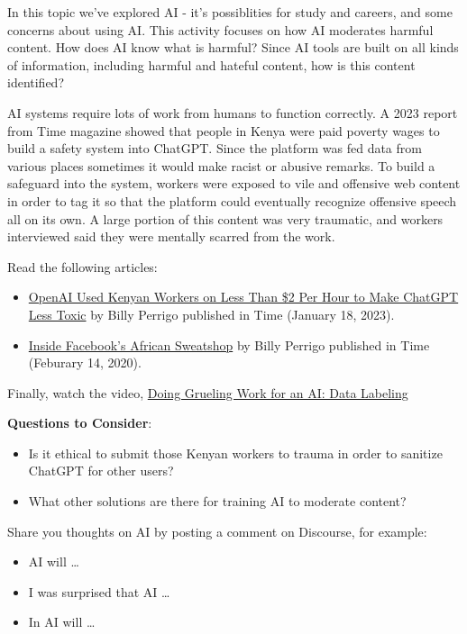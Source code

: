 \documentclass[
]{book}
\providecommand{\tightlist}{%
  \setlength{\itemsep}{0pt}\setlength{\parskip}{0pt}}
\theoremstyle{definition}
\theoremstyle{definition}
\theoremstyle{definition}
\theoremstyle{definition}
\theoremstyle{remark}
\begin{document}
\begin{reflect}
In this topic we've explored AI - it's possiblities for study and careers, and some concerns about using AI. This activity focuses on how AI moderates harmful content. How does AI know what is harmful? Since AI tools are built on all kinds of information, including harmful and hateful content, how is this content identified?

AI systems require lots of work from humans to function correctly. A 2023 report from Time magazine showed that people in Kenya were paid poverty wages to build a safety system into ChatGPT. Since the platform was fed data from various places sometimes it would make racist or abusive remarks. To build a safeguard into the system, workers were exposed to vile and offensive web content in order to tag it so that the platform could eventually recognize offensive speech all on its own. A large portion of this content was very traumatic, and workers interviewed said they were mentally scarred from the work.

Read the following articles:

\begin{itemize}
\tightlist
\item
  \href{https://time.com/6247678/openai-chatgpt-kenya-workers/}{OpenAI Used Kenyan Workers on Less Than \$2 Per Hour to Make ChatGPT Less Toxic} by Billy Perrigo published in Time (January 18, 2023).
\item
  \href{https://time.com/6147458/facebook-africa-content-moderation-employee-treatment/}{Inside Facebook's African Sweatshop} by Billy Perrigo published in Time (Feburary 14, 2020).
\end{itemize}

Finally, watch the video, \href{https://www.youtube.com/watch?v=ug_p2wHhla0}{Doing Grueling Work for an AI: Data Labeling}

\textbf{Questions to Consider}:

\begin{itemize}
\tightlist
\item
  Is it ethical to submit those Kenyan workers to trauma in order to sanitize ChatGPT for other users?
\item
  What other solutions are there for training AI to moderate content?
\end{itemize}

Share you thoughts on AI by posting a comment on Discourse, for example:

\begin{itemize}
\tightlist
\item
  AI will \ldots{}\\
\item
  I was surprised that AI \ldots{}\\
\item
  In AI will \ldots{}
\end{itemize}
\end{reflect}
\end{document}
